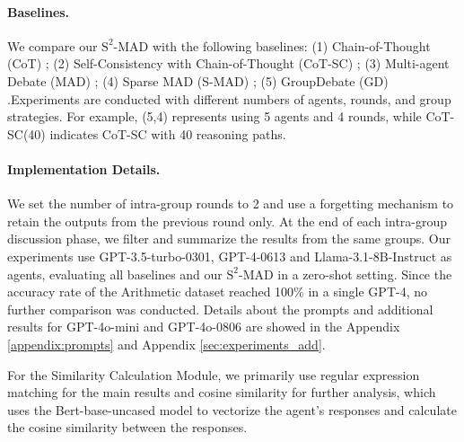 \paragraph{Baselines.} We compare our \({\text{S}^2\text{-MAD}}\) with the following baselines: (1) Chain-of-Thought (CoT) \cite{wei2023chainofthought}; (2) Self-Consistency with Chain-of-Thought (CoT-SC) \cite{wang2023selfconsistency}; (3) Multi-agent Debate (MAD) \cite{liang2023encouraging}; (4) Sparse MAD (S-MAD) \cite{li2024improving}; (5) GroupDebate (GD) \cite{liu2024GroupDebate}.Experiments are conducted with different numbers of agents, rounds, and group strategies. For example, (5,4) represents using 5 agents and 4 rounds, while CoT-SC(40) indicates CoT-SC with 40 reasoning paths.

\paragraph{Implementation Details.} We set the number of intra-group rounds to 2 and use a forgetting mechanism to retain the outputs from the previous round only. At the end of each intra-group discussion phase, we filter and summarize the results from the same groups. Our experiments use GPT-3.5-turbo-0301, GPT-4-0613 and Llama-3.1-8B-Instruct as agents, evaluating all baselines and our \({\text{S}^2\text{-MAD}}\) in a zero-shot setting. Since the accuracy rate of the Arithmetic dataset reached 100\% in a single GPT-4, no further comparison was conducted. Details about the prompts 
and additional results for GPT-4o-mini and GPT-4o-0806 are showed in the Appendix \ref{appendix:prompts} and Appendix \ref{sec:experiments_add}.

For the Similarity Calculation Module, we primarily use regular expression matching for the main results and cosine similarity for further analysis, which uses the Bert-base-uncased model to vectorize the agent’s responses and calculate the cosine similarity between the responses. 


